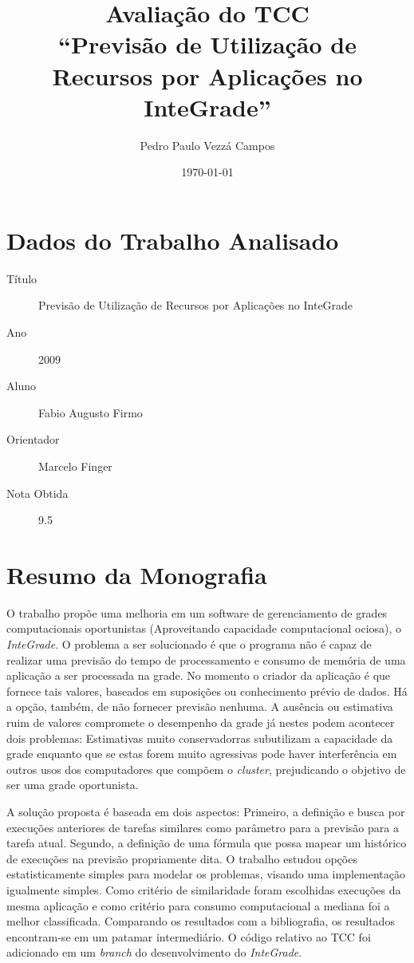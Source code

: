\documentclass{article}
\begin{document}
\author{Pedro Paulo Vezzá Campos}
\title{Avaliação do TCC \\ ``Previsão de Utilização de Recursos por Aplicações no InteGrade''}
\date{\today}
\maketitle

\section{Dados do Trabalho Analisado}
	\begin{description}
		\item[Título] Previsão de Utilização de Recursos por Aplicações no InteGrade
		\item[Ano] 2009
		\item[Aluno] Fabio Augusto Firmo
		\item[Orientador] Marcelo Finger
		\item[Nota Obtida] 9.5
	\end{description}

\section{Resumo da Monografia}
	O trabalho propõe uma melhoria em um software de gerenciamento de grades computacionais oportunistas (Aproveitando capacidade computacional ociosa), o \emph{InteGrade}. O problema a ser solucionado é que o programa não é capaz de realizar uma previsão do tempo de processamento e consumo de memória de uma aplicação a ser processada na grade. No momento o criador da aplicação é que fornece tais valores, baseados em suposições ou conhecimento prévio de dados. Há a opção, também, de não fornecer previsão nenhuma. A ausência ou estimativa ruim de valores compromete o desempenho da grade já nestes podem acontecer dois problemas: Estimativas muito conservadorras subutilizam a capacidade da grade enquanto que se estas forem muito agressivas pode haver interferência em outros usos dos computadores que compõem o \emph{cluster}, prejudicando o objetivo de ser uma grade oportunista.

	A solução proposta é baseada em dois aspectos: Primeiro, a definição e busca por execuções anteriores de tarefas similares como parâmetro para a previsão para a tarefa atual. Segundo, a definição de uma fórmula que possa mapear um histórico de execuções na previsão propriamente dita. O trabalho estudou opções estatisticamente simples para modelar os problemas, visando uma implementação igualmente simples. Como critério de similaridade foram escolhidas execuções da mesma aplicação e como critério para consumo computacional a mediana foi a melhor classificada. Comparando os resultados com a bibliografia, os resultados encontram-se em um patamar intermediário. O código relativo ao TCC foi adicionado em um \emph{branch} do desenvolvimento do \emph{InteGrade}.
	
\end{document}
